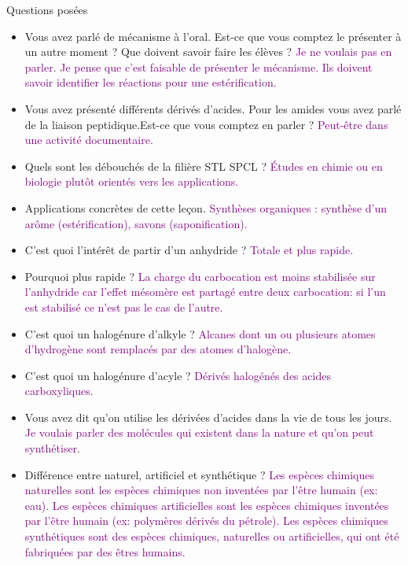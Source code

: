 \begin{reportBlock}{Questions posées}

\begin{itemize}

\item Vous avez parlé de mécanisme à l'oral. Est-ce que vous comptez le présenter à un autre moment ? Que doivent savoir faire les élèves ? \textcolor{purple}{Je ne voulais pas en parler. Je pense que c'est faisable de présenter le mécanisme. Ils doivent savoir identifier les réactions pour une estérification.}

\item Vous avez présenté différents dérivés d'acides. Pour les amides vous avez parlé de la liaison peptidique.Est-ce que vous comptez en parler ? \textcolor{purple}{Peut-être dans une activité documentaire. }


\item Quels sont les débouchés de la filière STL SPCL ? \textcolor{purple}{Études en chimie ou en biologie plutôt orientés vers les applications.}


\item Applications concrètes de cette leçon. \textcolor{purple}{Synthèses organiques : synthèse d'un arôme (estérification), savons (saponification).}


\item C'est quoi l'intérêt de partir d'un anhydride ? \textcolor{purple}{Totale et plus rapide.}


\item Pourquoi plus rapide ? \textcolor{purple}{La charge du carbocation est moins stabilisée sur l'anhydride car l'effet mésomère est partagé entre deux carbocation: si l'un est stabilisé ce n'est pas le cas de l'autre.}


\item C'est quoi un halogénure d'alkyle ? \textcolor{purple}{Alcanes dont un ou plusieurs atomes d'hydrogène sont remplacés par des atomes d'halogène.}

\item C'est quoi un halogénure d'acyle ? \textcolor{purple}{Dérivés halogénés des acides carboxyliques.}


\item Vous avez dit qu'on utilise les dérivées d'acides dans la vie de tous les jours. \textcolor{purple}{Je voulais parler des molécules qui existent dans la nature et qu'on peut synthétiser.}



\item Différence entre naturel, artificiel et synthétique ? \textcolor{purple}{Les espèces chimiques naturelles sont les espèces chimiques non inventées par l'être humain (ex: eau). Les espèces chimiques artificielles sont les espèces chimiques inventées par l'être humain (ex: polymères dérivés du pétrole). Les espèces chimiques synthétiques sont des espèces chimiques, naturelles ou artificielles, qui ont été fabriquées par des êtres humains.}




\end{itemize}
\end{reportBlock}
